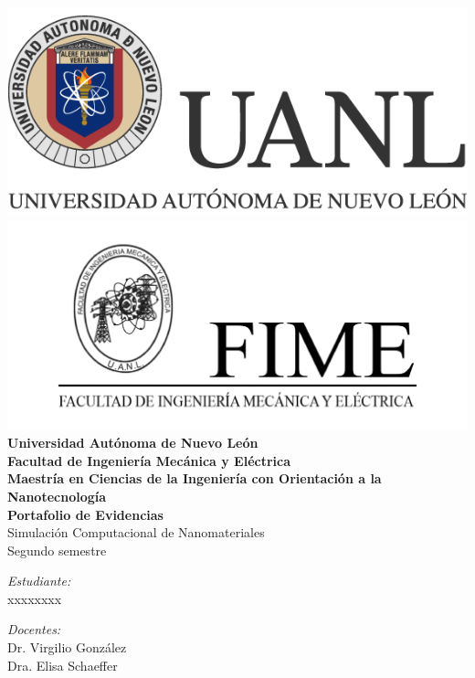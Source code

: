 \documentclass[a4paper,12pt]{report}
\begin{document}
\begin{titlepage}

\begin{center}


	\includegraphics[scale=0.3]{uanl.png}
	\includegraphics[scale=0.4]{fime.png}\\[1.5cm]
	

{\large \textbf{Universidad Autónoma de Nuevo León}\\[0.2cm]}
  \textbf{Facultad de Ingeniería Mecánica y Eléctrica}\\[0.1cm]
    \textbf{Maestría en Ciencias de la Ingeniería con Orientación a la Nanotecnología}
\textsc{\Large }\\[1.5cm]
{\large \bfseries Portafolio de Evidencias}\\[0.5cm]
{\large Simulación Computacional de Nanomateriales}\\[.2cm]
{Segundo semestre}\\[.5cm]




\noindent
\begin{minipage}{0.4\textwidth}
  \begin{flushleft} \large
    \emph{\color{orange!80!black}Estudiante:}\\
    xxxxxxxx\\
  \end{flushleft}
\end{minipage}%
\begin{minipage}{0.5\textwidth}
  \begin{flushright} \large
    \emph{\color{orange!80!black}Docentes:} \\
    Dr. Virgilio González\\
    Dra. Elisa Schaeffer\\
  \end{flushright}
\end{minipage}\\[1cm]


\end{center}
\end{titlepage}
\end{document}
